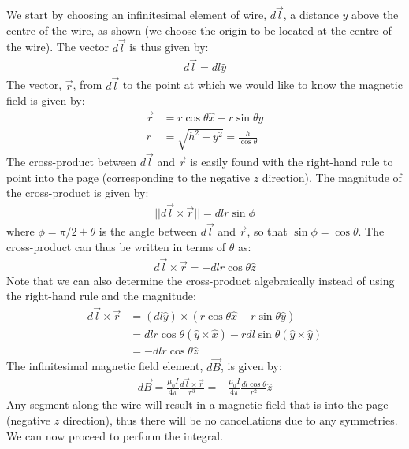 We start by choosing an infinitesimal element of wire, $d\vec l$, a distance $y$ above the centre of the wire, as shown (we choose the origin to be located at the centre of the wire). The vector $d\vec l$ is thus given by:
\begin{align*}
d\vec l = dl\hat y
\end{align*}
The vector, $\vec r$, from $d\vec l$ to the point at which we would like to know the magnetic field is given by:
\begin{align*}
\vec r &= r\cos\theta\hat x -r\sin\theta\hat y\\
r &=\sqrt{h^2+y^2} =\frac{h}{\cos\theta}
\end{align*}
The cross-product between $d\vec l$ and $\vec r$ is easily found with the right-hand rule to point into the page (corresponding to the negative $z$ direction). The magnitude of the cross-product is given by:
\begin{align*}
||d\vec l \times \vec r||=dl r \sin\phi
\end{align*}
where $\phi=\pi/2+\theta$ is the angle between $d\vec l$ and $\vec r$, so that $\sin\phi=\cos\theta$. The cross-product can thus be written in terms of $\theta$ as:
\begin{align*}
d\vec l \times \vec r=-dl r \cos\theta \hat z
\end{align*}
Note that we can also determine the cross-product algebraically instead of using the right-hand rule and the magnitude:
\begin{align*}
d\vec l \times \vec r &= (dl\hat y) \times (r\cos\theta\hat x -r\sin\theta\hat y)\\
&=dlr\cos\theta (\hat y \times\hat x) - rdl\sin\theta(\hat y \times \hat y)\\
&=-dlr\cos\theta \hat z 
\end{align*}
The infinitesimal magnetic field element, $d\vec B$, is given by:
\begin{align*}
d\vec B = \frac{\mu_0 I}{4\pi}\frac{d\vec l\times \vec r}{r^3}=-\frac{\mu_0 I}{4\pi}\frac{dl\cos\theta}{r^2}\hat z
\end{align*}
Any segment along the wire will result in a magnetic field that is into the page (negative $z$ direction), thus there will be no cancellations due to any symmetries. We can now proceed to perform the integral.

